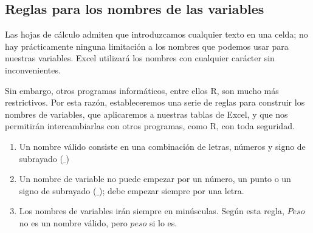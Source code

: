 \documentclass[
  letterpaper,
  DIV=11,
  numbers=noendperiod,
  oneside]{scrreprt}
\providecommand{\tightlist}{%
  \setlength{\itemsep}{0pt}\setlength{\parskip}{0pt}}\usepackage{longtable,booktabs,array}
\begin{document}
\hypertarget{reglas-para-los-nombres-de-las-variables}{%
\subsection{Reglas para los nombres de las
variables}\label{reglas-para-los-nombres-de-las-variables}}

Las hojas de cálculo admiten que introduzcamos cualquier texto en una
celda; no hay prácticamente ninguna limitación a los nombres que podemos
usar para nuestras variables. Excel utilizará los nombres con cualquier
carácter sin inconvenientes.

Sin embargo, otros programas informáticos, entre ellos R, son mucho más
restrictivos. Por esta razón, estableceremos una serie de reglas para
construir los nombres de variables, que aplicaremos a nuestras tablas de
Excel, y que nos permitirán intercambiarlas con otros programas, como R,
con toda seguridad.

\begin{enumerate}
\def\labelenumi{\arabic{enumi}.}
\tightlist
\item
  Un nombre válido consiste en una combinación de letras, números y
  signo de subrayado (\(\_\))
\item
  Un nombre de variable no puede empezar por un número, un punto o un
  signo de subrayado (\(\_\)); debe empezar siempre por una letra.
\item
  Los nombres de variables irán siempre en minúsculas. Según esta regla,
  \(Peso\) no es un nombre válido, pero \(peso\) si lo es.
\end{enumerate}

{}
\end{document}
